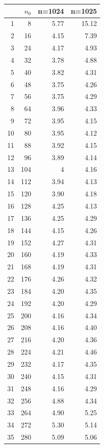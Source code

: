 \documentclass[a4paper, 11pt]{article}
\begin{document}
\begin{table}[ht]
	\centering
	\begin{tabular}{rrrr}
		\hline
		& $n_0$ & n=1024 & n=1025 \\ 
		\hline
		1 & 8 & 5.77 & 15.12 \\ 
		2 & 16 & 4.15 & 7.39 \\ 
		3 & 24 & 4.17 & 4.93 \\ 
		4 & 32 & 3.78 & 4.88 \\ 
		5 & 40 & 3.82 & 4.31 \\ 
		6 & 48 & 3.75 & 4.26 \\ 
		7 & 56 & 3.75 & 4.29 \\ 
		8 & 64 & 3.96 & 4.33 \\ 
		9 & 72 & 3.95 & 4.15 \\ 
		10 & 80 & 3.95 & 4.12 \\ 
		11 & 88 & 3.92 & 4.15 \\ 
		12 & 96 & 3.89 & 4.14 \\ 
		13 & 104 & 4 & 4.16 \\ 
		14 & 112 & 3.94 & 4.13 \\ 
		15 & 120 & 3.90 & 4.18 \\ 
		16 & 128 & 4.25 & 4.13 \\ 
		17 & 136 & 4.25 & 4.29 \\ 
		18 & 144 & 4.15 & 4.26 \\ 
		19 & 152 & 4.27 & 4.31 \\ 
		20 & 160 & 4.19 & 4.33 \\ 
		21 & 168 & 4.19 & 4.31 \\ 
		22 & 176 & 4.26 & 4.32 \\ 
		23 & 184 & 4.20 & 4.35 \\ 
		24 & 192 & 4.20 & 4.29 \\ 
		25 & 200 & 4.16 & 4.34 \\ 
		26 & 208 & 4.16 & 4.40 \\ 
		27 & 216 & 4.20 & 4.36 \\ 
		28 & 224 & 4.21 & 4.46 \\ 
		29 & 232 & 4.17 & 4.35 \\ 
		30 & 240 & 4.15 & 4.31 \\ 
		31 & 248 & 4.16 & 4.29 \\ 
		32 & 256 & 4.88 & 4.34 \\ 
		33 & 264 & 4.90 & 5.25 \\ 
		34 & 272 & 5.30 & 5.14 \\ 
		35 & 280 & 5.09 & 5.06 \\ 
		\hline
	\end{tabular}
\end{table}
\end{document}

